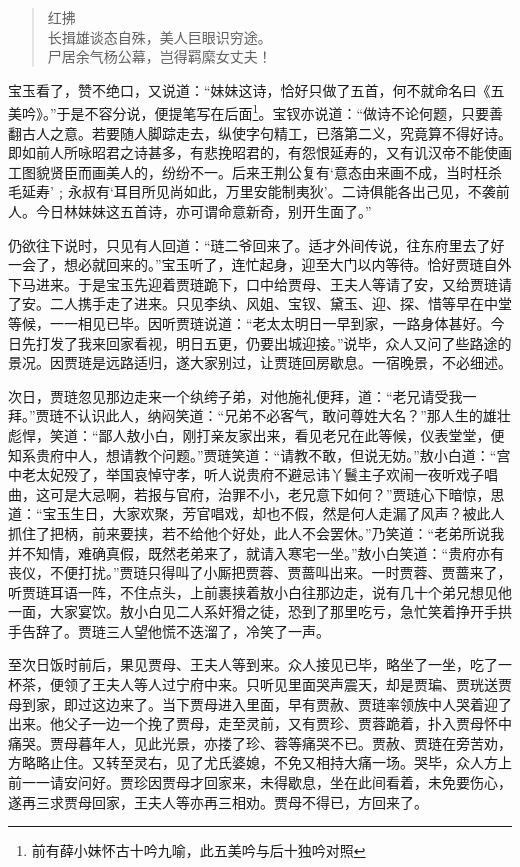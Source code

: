 \documentclass[12pt,oneside]{book}
\newenvironment{shici}{%
\begin{verse}%
\centering\large\hspace{12pt}}%
{\end{verse}}
\begin{document}
\begin{shici}
红拂\\
长揖雄谈态自殊，美人巨眼识穷途。\\
尸居余气杨公幕，岂得羁縻女丈夫！
\end{shici}

宝玉看了，赞不绝口，又说道：“妹妹这诗，恰好只做了五首，何不就命名曰《五美吟》。”于是不容分说，便提笔写在后面\footnote{前有薛小妹怀古十吟九喻，此五美吟与后十独吟对照}。宝钗亦说道：“做诗不论何题，只要善翻古人之意。若要随人脚踪走去，纵使字句精工，已落第二义，究竟算不得好诗。即如前人所咏昭君之诗甚多，有悲挽昭君的，有怨恨延寿的，又有讥汉帝不能使画工图貌贤臣而画美人的，纷纷不一。后来王荆公复有‘意态由来画不成，当时枉杀毛延寿’﹔永叔有‘耳目所见尚如此，万里安能制夷狄’。二诗俱能各出己见，不袭前人。今日林妹妹这五首诗，亦可谓命意新奇，别开生面了。”

仍欲往下说时，只见有人回道：“琏二爷回来了。适才外间传说，往东府里去了好一会了，想必就回来的。”宝玉听了，连忙起身，迎至大门以内等待。恰好贾琏自外下马进来。于是宝玉先迎着贾琏跪下，口中给贾母、王夫人等请了安，又给贾琏请了安。二人携手走了进来。只见李纨、风姐、宝钗、黛玉、迎、探、惜等早在中堂等候，一一相见已毕。因听贾琏说道：“老太太明日一早到家，一路身体甚好。今日先打发了我来回家看视，明日五更，仍要出城迎接。”说毕，众人又问了些路途的景况。因贾琏是远路适归，遂大家别过，让贾琏回房歇息。一宿晚景，不必细述。

次日，贾琏忽见那边走来一个纨绔子弟，对他施礼便拜，道：“老兄请受我一拜。”贾琏不认识此人，纳闷笑道：“兄弟不必客气，敢问尊姓大名？”那人生的雄壮彪悍，笑道：“鄙人敖小白，刚打亲友家出来，看见老兄在此等候，仪表堂堂，便知系贵府中人，想请教个问题。”贾琏笑道：“请教不敢，但说无妨。”敖小白道：“宫中老太妃殁了，举国哀悼守孝，听人说贵府不避忌讳丫鬟主子欢闹一夜听戏子唱曲，这可是大忌啊，若报与官府，治罪不小，老兄意下如何？”贾琏心下暗惊，思道：“宝玉生日，大家欢聚，芳官唱戏，却也不假，然是何人走漏了风声？被此人抓住了把柄，前来要挟，若不给他个好处，此人不会罢休。”乃笑道：“老弟所说我并不知情，难确真假，既然老弟来了，就请入寒宅一坐。”敖小白笑道：“贵府亦有丧仪，不便打扰。”贾琏只得叫了小厮把贾蓉、贾蔷叫出来。一时贾蓉、贾蔷来了，听贾琏耳语一阵，不住点头，上前裹挟着敖小白往那边走，说有几十个弟兄想见他一面，大家宴饮。敖小白见二人系奸猾之徒，恐到了那里吃亏，急忙笑着挣开手拱手告辞了。贾琏三人望他慌不迭溜了，冷笑了一声。

至次日饭时前后，果见贾母、王夫人等到来。众人接见已毕，略坐了一坐，吃了一杯茶，便领了王夫人等人过宁府中来。只听见里面哭声震天，却是贾㻞、贾珖送贾母到家，即过这边来了。当下贾母进入里面，早有贾赦、贾琏率领族中人哭着迎了出来。他父子一边一个挽了贾母，走至灵前，又有贾珍、贾蓉跪着，扑入贾母怀中痛哭。贾母暮年人，见此光景，亦搂了珍、蓉等痛哭不已。贾赦、贾琏在旁苦劝，方略略止住。又转至灵右，见了尤氏婆媳，不免又相持大痛一场。哭毕，众人方上前一一请安问好。贾珍因贾母才回家来，未得歇息，坐在此间看着，未免要伤心，遂再三求贾母回家，王夫人等亦再三相劝。贾母不得已，方回来了。
\end{document}
